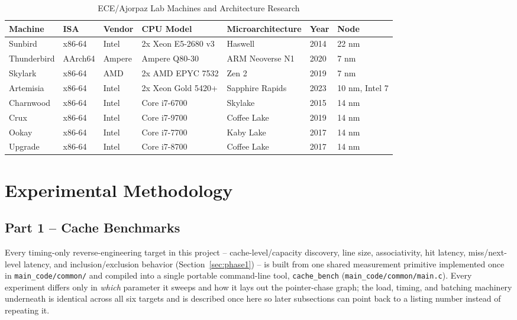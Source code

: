 \documentclass{article}
\begin{document}
\begin{table}[htbp]
\centering
\small
\caption{ECE/Ajorpaz Lab Machines and Architecture Research}
\label{tab:machines}

\begin{tabularx}{\textwidth}{|l|X|l|l|l|l|l|}
\hline
\textbf{Machine} &
\textbf{ISA} &
\textbf{Vendor} &
\textbf{CPU Model} &
\textbf{Microarchitecture} &
\textbf{Year} &
\textbf{Node} \\
\hline

Sunbird &
x86-64 &
Intel &
2x Xeon E5-2680 v3 &
Haswell &
2014 &
22 nm\\
\hline

Thunderbird &
AArch64 &
Ampere &
Ampere Q80-30 &
ARM Neoverse N1 &
2020 &
7 nm\\
\hline

Skylark &
x86-64 &
AMD &
2x AMD EPYC 7532 &
Zen 2 &
2019 &
7 nm \\
\hline

Artemisia &
x86-64 &
Intel &
2x Xeon Gold 5420+ &
Sapphire Rapids &
2023 &
10 nm, Intel 7\\
\hline

Charnwood &
x86-64 &
Intel &
Core i7-6700 &
Skylake &
2015 &
14 nm\\
\hline

Crux &
x86-64 &
Intel &
Core i7-9700 &
Coffee Lake &
2019 &
14 nm\\
\hline

Ookay &
x86-64 &
Intel &
Core i7-7700 &
Kaby Lake &
2017 &
14 nm\\
\hline

Upgrade &
x86-64 &
Intel &
Core i7-8700 &
Coffee Lake &
2017 &
14 nm\\
\hline

\end{tabularx}

\end{table}

\section{Experimental Methodology}

\subsection{Part 1 -- Cache Benchmarks}

Every timing-only reverse-engineering target in this project -- cache-level/capacity
discovery, line size, associativity, hit latency, miss/next-level latency, and
inclusion/exclusion behavior (Section~\ref{sec:phase1}) -- is built from one shared
measurement primitive implemented once in \texttt{main\_code/common/} and compiled into a
single portable command-line tool, \texttt{cache\_bench}
(\texttt{main\_code/common/main.c}). Every experiment differs only in \emph{which}
parameter it sweeps and how it lays out the pointer-chase graph; the load, timing, and
batching machinery underneath is identical across all six targets and is described once
here so later subsections can point back to a listing number instead of repeating it.
\end{document}
